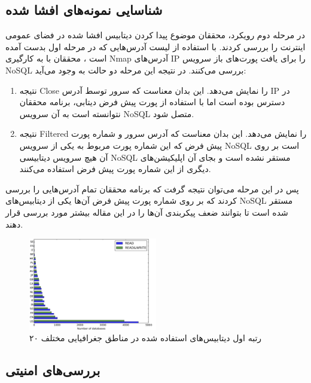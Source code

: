 \documentclass[10pt, a4paper]{article}
\begin{document}
\subsection{شناسایی نمونه‌های افشا شده}

در مرحله دوم رویکرد، محققان موضوع پیدا کردن دیتابیس افشا شده در فضای عمومی
اینترنت را بررسی کردند. با استفاده از لیست آدرس‌هایی که در مرحله اول بدست آمده
است \cite{officialNmap}، محققان با به کارگیری Nmap آدرس‌های IP را برای یافت
پورت‌های باز سرویس NoSQL بررسی می‌کنند. در نتیجه این مرحله دو حالت به وجود
می‌آید:

\begin{enumerate}
    \item نتیجه Close را نمایش می‌دهد. این بدان معناست که سرور توسط آدرس IP در
    دسترس بوده است اما با استفاده از پورت پیش فرض دیتابی، برنامه محققان نتوانسته
    است به آن سرویس NoSQL متصل شود.
    \item نتیجه Filtered را نمایش می‌دهد. این بدان معناست که آدرس سرور و شماره
    پورت پیش فرض که این شماره پورت مربوط به یکی از سرویس NoSQL است بر روی آن هیچ
    سرویس دیتابیسی NoSQL مستقر نشده است و بجای آن اپلیکیشن‌های دیگری از این
    شماره پورت پیش فرض استفاده می‌کنند.
\end{enumerate}

پس در این مرحله می‌توان نتیجه گرفت که برنامه محققان تمام آدرس‌هایی را بررسی
کردند که بر روی شماره پورت پیش فرض آن‌ها یکی از دیتابیس‌های NoSQL مستقر شده است
تا بتوانند ضعف پیکربندی آن‌ها را در این مقاله بیشتر مورد بررسی قرار دهند.

\begin{figure}[H]
    \centering
    \includegraphics[width=0.5\textwidth]{res/fig3.png}
    \caption{۲۰ رتبه اول دیتابیس‌‌های استفاده شده در مناطق جغرافیایی مختلف}
    \label{fig: diagram}
\end{figure}


\subsection{بررسی‌های امنیتی}
\end{document}
